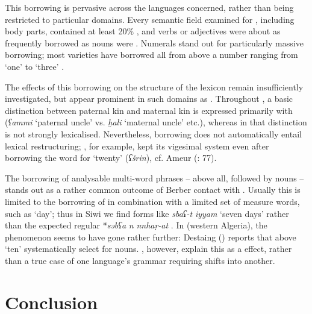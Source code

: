 \documentclass[output=paper]{langsci/langscibook}
\begin{document}
This borrowing is pervasive across the languages concerned, rather than being restricted to particular domains. Every semantic field examined for , including body parts, contained at least 20\% , and verbs or adjectives were about as frequently borrowed as nouns were \citep{Kossmann2009}. Numerals stand out for particularly massive borrowing; most  varieties have borrowed all  from  above a number ranging from `one' to `three' \citep{Souag2007}.

The effects of this borrowing on the structure of the lexicon remain insufficiently investigated, but appear prominent in such domains as . Throughout , a basic distinction between paternal kin and maternal kin is expressed primarily with   (\textit{ʕammi} `paternal uncle' vs. \textit{ḫali} `maternal uncle' etc.), whereas in  that distinction is not strongly lexicalised. Nevertheless, borrowing does not automatically entail lexical restructuring; , for example, kept its vigesimal system even after borrowing the  word for `twenty' (\textit{ʕšrin}), cf. Ameur (\citeyear{Ameur2008}: 77).

The borrowing of analysable multi-word phrases – above all,  followed by nouns – stands out as a rather common outcome of Berber contact with . Usually this is limited to the borrowing of  in combination with a limited set of measure words, such as `day'; thus in Siwi we find forms like \textit{sbaʕ-t} \textit{iyyam} `seven days' rather than the expected regular  *\textit{səbʕa} \textit{n} \textit{nnhaṛ-at }\citep[114]{Souag2013book}. In  (western Algeria), the phenomenon seems to have gone rather further: Destaing (\citeyear[212]{Destaing1907}) reports that  above `ten' systematically select for  nouns.  \citet{SouagKherbache2016}, however, explain this as a  effect, rather than a true case of one language's grammar requiring shifts into another.

\section{Conclusion}
\end{document}
